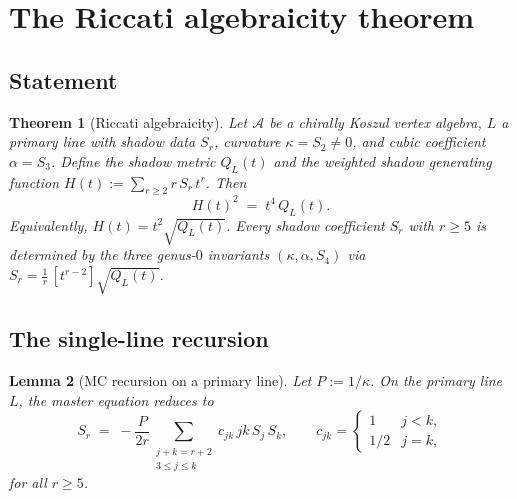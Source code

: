 \documentclass[11pt,reqno]{amsart}
\newtheorem{theorem}{Theorem}[section]
\newtheorem{lemma}[theorem]{Lemma}
\theoremstyle{definition}
\theoremstyle{remark}
\newcommand{\cA}{\mathcal{A}}
\numberwithin{equation}{section}
\begin{document}

\section{The Riccati algebraicity theorem}
\label{sec:algebraicity}

\subsection{Statement}\label{subsec:riccati-statement}

\begin{theorem}[Riccati algebraicity]\label{thm:riccati}
Let $\cA$ be a chirally Koszul vertex algebra, $L$ a
primary line with shadow data $S_r$, curvature
$\kappa = S_2 \ne 0$, and cubic coefficient
$\alpha = S_3$. Define the shadow metric $Q_L(t)$ and
the weighted shadow generating function
$H(t) := \sum_{r \ge 2} r\, S_r\, t^r$. Then
\begin{equation}\label{eq:algebraicity}
 H(t)^2 \;=\; t^4\,Q_L(t).
\end{equation}
Equivalently, $H(t) = t^2\sqrt{Q_L(t)}$.
Every shadow coefficient $S_r$ with $r \ge 5$ is
determined by the three genus-$0$ invariants
$(\kappa, \alpha, S_4)$ via
$S_r = \frac{1}{r}\,[t^{r-2}]\sqrt{Q_L(t)}$.
\end{theorem}

\subsection{The single-line
recursion}\label{subsec:recursion}

\begin{lemma}[MC recursion on a primary
line]\label{lem:mc-recursion}
Let $P := 1/\kappa$. On the primary line~$L$, the
master equation reduces to
\begin{equation}\label{eq:recursion}
 S_r
 \;=\;
 -\frac{P}{2r}
 \sum_{\substack{j + k = r + 2 \\ 3 \le j \le k}}
 c_{jk}\, jk\, S_j\, S_k,
 \qquad
 c_{jk} =
 \begin{cases} 1 & j < k, \\ 1/2 & j = k, \end{cases}
\end{equation}
for all $r \ge 5$.
\end{lemma}
\end{document}
